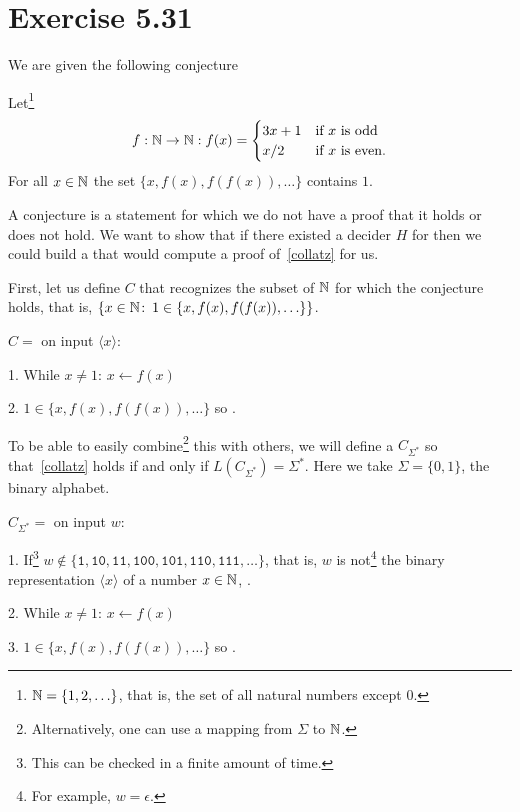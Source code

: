 \section{Exercise 5.31}
We are given the following conjecture
\begin{conjecture}\label{collatz}
	Let\footnote{\(\mathbb{N} = \{1,2,\ldots\}\), that is, the set of all natural
		numbers except \(0\).}
\begin{displaymath}
f:\mathbb{N} \to \mathbb{N}:f(x) = \begin{cases}
	3 x + 1 & \text{if \(x\) is odd}\\
	x / 2 & \text{if \(x\) is even}.
\end{cases}
\end{displaymath}
For all \(x \in \mathbb{N}\) the set \(\{x,f(x),f(f(x)),\ldots\}\) contains \(1\).
\end{conjecture}
A conjecture is a statement
for which we do not have a proof that it holds or does not hold.
We want to show that if there existed a decider \(H\) for \Atm{}
then we could build a
\TM{} that would compute a proof of~\ref{collatz} for us.

First, let us define \TM{} \(C\) that recognizes
the subset of \(\mathbb{N}\)
for which the conjecture holds, that is, \(\{x \in \mathbb{N} \colon\, 1 \in
\{x,f(x),f(f(x)),\ldots\} \}\).

\begin{TMachine}{\(C =\) on input \(\langle x \rangle\):}
\item[1.] While \(x \neq 1\): \(x \gets f(x)\)
\item[2.] \(1 \in \{x,f(x),f(f(x)),\ldots\}\) so \accept.
\end{TMachine}

To be able to easily combine\footnote{Alternatively, one can use a mapping from
\(\Sigma\) to \(\mathbb{N}\).} this \TM{} with others, we will define
a \TM{} \(C_{\Sigma^*}\) so that~\ref{collatz} holds if and only if
\(L(C_{\Sigma^*}) =
		\Sigma^*\). Here we take \(\Sigma = \{0,1\}\), the binary alphabet.

\begin{TMachine}{\(C_{\Sigma^*} =\) on input \(w\):}
\item[1.] If\footnote{This can be checked in a finite amount of time.} \(w \not\in
\{\texttt{1},\texttt{10},\texttt{11},\texttt{100},\texttt{101},\texttt{110},\texttt{111},\ldots\}\),
that is, \(w\) is not\footnote{For example, \(w
	= \epsilon\).} the binary representation \(\langle x \rangle\)
		of a number \(x \in \mathbb{N}\), \accept.
	\item[2.] While \(x \neq 1\): \(x \gets f(x)\)
	\item[3.] \(1 \in \{x,f(x),f(f(x)),\ldots\}\) so \accept.
\end{TMachine}

